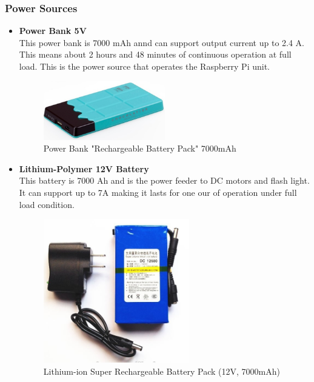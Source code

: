 \documentclass[12pt]{article}
\begin{document}
\subsubsection{Power Sources}
\begin{itemize}

	\item \textbf{Power Bank 5V}\\
	This power bank is 7000 mAh annd can support output current up to 2.4 A. This means about 2 hours and 48 minutes of continuous operation at full load. This is the power source that operates the Raspberry Pi unit.
	\begin{figure}[H]
		\centering
		\includegraphics[width =0.5\textwidth]{Fig/Electronics/power-bank.jpg}
		\caption{Power Bank "Rechargeable Battery Pack" 7000mAh}
		\label{fig:powerbank}
	\end{figure}

	\item \textbf{Lithium-Polymer 12V Battery}\\
	This battery is 7000 Ah and is the power feeder to DC motors and flash light. It can support up to 7A making it lasts for one our of operation under full load condition.
	\begin{figure}[H]
		\centering
		\includegraphics[width =0.6\textwidth]{Fig/Electronics/bat12.jpg}
		\caption{Lithium-ion Super Rechargeable Battery Pack (12V, 7000mAh)}
		\label{fig:bat12}
	\end{figure}
	

\end{itemize}
\end{document}
